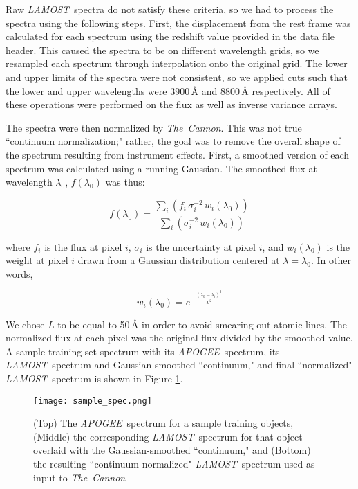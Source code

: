 \documentclass[12pt, preprint]{aastex}
\newcommand{\tc}{\textsl{The~Cannon}}
\newcommand{\apogee}{\textsl{APOGEE}}
\newcommand{\lamost}{\textsl{LAMOST}}
\begin{document}
Raw \lamost\ spectra do not satisfy these criteria, so we had to process the
spectra using the following steps. First, the displacement from the rest frame was
calculated for each spectrum using the redshift value provided in 
the data file header. This caused the spectra to be on different 
wavelength grids, so we resampled each spectrum through interpolation
onto the original grid. The lower and upper limits of the spectra were 
not consistent, so we applied cuts such that the lower and upper 
wavelengths were 3900\,$\mbox{\AA}$ and 8800\,$\mbox{\AA}$ respectively.
All of these operations were performed on the flux as well as inverse variance
arrays. 

The spectra were then normalized by \tc. 
This was not true ``continuum normalization;" rather, the goal was to remove
the overall shape of the spectrum resulting from instrument effects. 
First, a smoothed version of each spectrum was calculated using a running Gaussian. 
The smoothed
flux at wavelength $\lambda_0$, $\bar{f} (\lambda_0)$ was thus:

\begin{equation}
\bar{f}(\lambda_0) = \frac{\sum_i (f_i\,\sigma^{-2}_i\,w_i(\lambda_0))}{\sum_i (\sigma^{-2}_i\,w_i(\lambda_0))}
\end{equation}

\noindent where $f_i$ is the flux at pixel $i$, $\sigma_i$ is the uncertainty at pixel $i$, 
and $w_i (\lambda_0)$ is the weight at pixel $i$ drawn from a Gaussian distribution 
centered at $\lambda=\lambda_0$. In other words, 

\begin{equation}
w_i(\lambda_0) = e^{-\frac{(\lambda_0-\lambda_i)^2}{L^2}}
\end{equation}

\noindent We chose $L$ to be equal to 50\,$\mbox{\AA}$ in order to avoid 
smearing out atomic lines. The normalized flux at each pixel was the 
original flux divided by the smoothed value. 
A sample training set spectrum with its \apogee\ spectrum, its 
\lamost\ spectrum and Gaussian-smoothed ``continuum," 
and final ``normalized" \lamost\ spectrum is shown in 
Figure \ref{fig:sample_spec}. 

\begin{figure}[h!]
\centering
\texttt{[image: sample\_spec.png]}
\caption{(Top) The \apogee\ spectrum for a sample training objects,
(Middle) the corresponding \lamost\ spectrum for that object overlaid
with the Gaussian-smoothed ``continuum," and (Bottom) the 
resulting ``continuum-normalized"
\lamost\ spectrum used as input to \tc}
\label{fig:sample_spec}
\end{figure}
\end{document}
